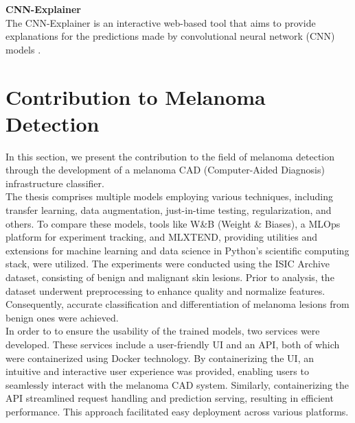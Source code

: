 \newpage

\vspace{0.5cm}
\textbf{CNN-Explainer} \\

The CNN-Explainer is an interactive web-based tool that aims to provide
explanations for the predictions made by convolutional neural network (CNN)
models \cite{CNNExplainer}.

\section{Contribution to Melanoma Detection}

In this section, we present the contribution to the field of melanoma detection
through the development of a melanoma CAD (Computer-Aided Diagnosis)
infrastructure classifier. \\

The thesis comprises multiple models employing various techniques, including
transfer learning, data augmentation, just-in-time testing, regularization, and
others. To compare these models, tools like W\&B (Weight \& Biases), a MLOps
platform for experiment tracking, and MLXTEND, providing utilities and
extensions for machine learning and data science in Python's scientific
computing stack, were utilized. The experiments were conducted using the ISIC
Archive dataset, consisting of benign and malignant skin lesions. Prior to
analysis, the dataset underwent preprocessing to enhance quality and normalize
features. Consequently, accurate classification and differentiation of melanoma
lesions from benign ones were achieved. \\

In order to to ensure the usability of the trained models,
two services were developed. These services include a user-friendly UI and an
API, both of which were containerized using Docker technology. By
containerizing the UI, an intuitive and interactive user experience was
provided, enabling users to seamlessly interact with the melanoma CAD system.
Similarly, containerizing the API streamlined request handling and prediction
serving, resulting in efficient performance. This approach facilitated easy
deployment across various platforms.
